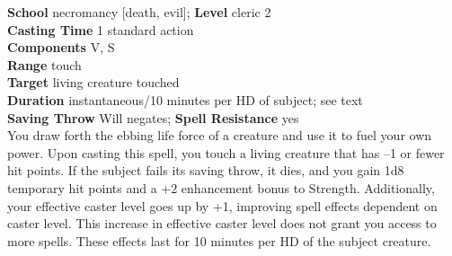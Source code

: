 \textbf{School} necromancy [death, evil]; \textbf{Level} cleric 2\\
\textbf{Casting Time} 1 standard action\\
\textbf{Components }V, S\\
\textbf{Range} touch\\
\textbf{Target} living creature touched\\
\textbf{Duration} instantaneous/10 minutes per HD of subject; see text\\
\textbf{Saving Throw }Will negates; \textbf{Spell Resistance} yes\\
You draw forth the ebbing life force of a creature and use it to fuel your own power. Upon casting this spell, you touch a living creature that has --1 or fewer hit points. If the subject fails its saving throw, it dies, and you gain 1d8 temporary hit points and a +2 enhancement bonus to Strength. Additionally, your effective caster level goes up by +1, improving spell effects dependent on caster level. This increase in effective caster level does not grant you access to more spells. These effects last for 10 minutes per HD of the subject creature.\\
